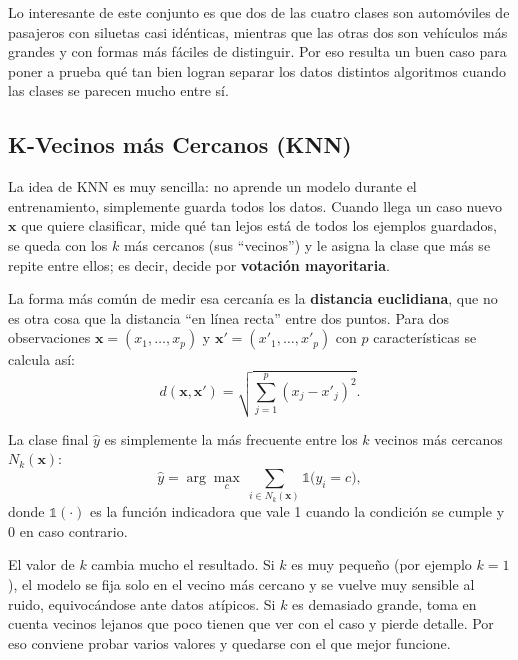 \documentclass[11pt,letterpaper,twoside]{article}
\begin{document}
Lo interesante de este conjunto es que dos de las cuatro clases son automóviles de pasajeros con siluetas casi idénticas, mientras que las otras dos son vehículos más grandes y con formas más fáciles de distinguir. Por eso resulta un buen caso para poner a prueba qué tan bien logran separar los datos distintos algoritmos cuando las clases se parecen mucho entre sí.

\subsection{K-Vecinos más Cercanos (KNN)}
La idea de KNN es muy sencilla: no aprende un modelo durante el entrenamiento, simplemente guarda todos los datos. Cuando llega un caso nuevo $\mathbf{x}$ que quiere clasificar, mide qué tan lejos está de todos los ejemplos guardados, se queda con los $k$ más cercanos (sus ``vecinos'') y le asigna la clase que más se repite entre ellos; es decir, decide por \textbf{votación mayoritaria}.

La forma más común de medir esa cercanía es la \textbf{distancia euclidiana}, que no es otra cosa que la distancia ``en línea recta'' entre dos puntos. Para dos observaciones $\mathbf{x}=(x_1,\dots,x_p)$ y $\mathbf{x}'=(x'_1,\dots,x'_p)$ con $p$ características se calcula así:
\begin{equation}
d(\mathbf{x},\mathbf{x}') = \sqrt{\sum_{j=1}^{p}\left(x_j - x'_j\right)^2}.
\label{eq:euclidiana}
\end{equation}

La clase final $\hat{y}$ es simplemente la más frecuente entre los $k$ vecinos más cercanos $N_k(\mathbf{x})$:
\begin{equation}
\hat{y} = \arg\max_{c}\ \sum_{i \in N_k(\mathbf{x})} \mathbb{1}\big(y_i = c\big),
\label{eq:votacion}
\end{equation}
donde $\mathbb{1}(\cdot)$ es la función indicadora que vale 1 cuando la condición se cumple y 0 en caso contrario.

\begin{nota}
El valor de $k$ cambia mucho el resultado. Si $k$ es muy pequeño (por ejemplo $k=1$), el modelo se fija solo en el vecino más cercano y se vuelve muy sensible al ruido, equivocándose ante datos atípicos. Si $k$ es demasiado grande, toma en cuenta vecinos lejanos que poco tienen que ver con el caso y pierde detalle. Por eso conviene probar varios valores y quedarse con el que mejor funcione.
\end{nota}
\end{document}
